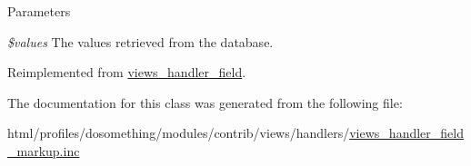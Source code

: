 \begin{DoxyParams}{Parameters}
\item[{\em \$values}]The values retrieved from the database. \end{DoxyParams}


Reimplemented from \hyperlink{classviews__handler__field_a82ff951c5e9ceb97b2eab86f880cbc1e}{views\_\-handler\_\-field}.

The documentation for this class was generated from the following file:\begin{DoxyCompactItemize}
\item 
html/profiles/dosomething/modules/contrib/views/handlers/\hyperlink{views__handler__field__markup_8inc}{views\_\-handler\_\-field\_\-markup.inc}\end{DoxyCompactItemize}
